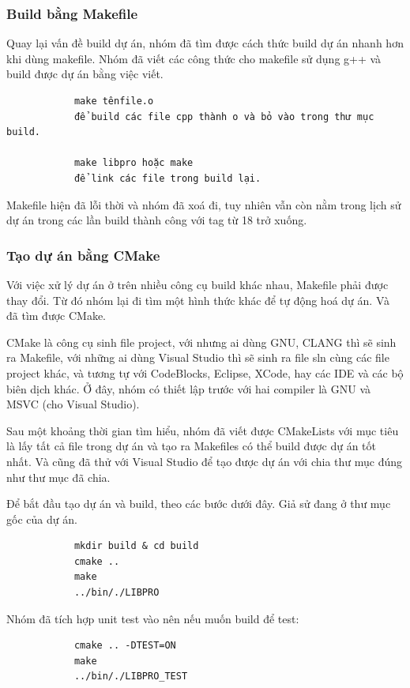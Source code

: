 \documentclass[12pt,a4paper]{report}
\begin{document}
            \subsubsection{Build bằng Makefile}

            Quay lại vấn đề build dự án, nhóm đã tìm được cách thức build dự án nhanh hơn khi dùng makefile. Nhóm đã viết các công thức cho makefile sử dụng g++ và build được dự án bằng việc viết.
            \begin{verbatim}
            make tênfile.o
            để build các file cpp thành o và bỏ vào trong thư mục build.

            make libpro hoặc make
            để link các file trong build lại.
            \end{verbatim}
            Makefile hiện đã lỗi thời và nhóm đã xoá đi, tuy nhiên vẫn còn nằm trong lịch sử dự án trong các lần build thành công với tag từ 18 trở xuống.

            \subsubsection{Tạo dự án bằng CMake}
            Với việc xử lý dự án ở trên nhiều công cụ build khác nhau, Makefile phải được thay đổi. Từ đó nhóm lại đi tìm một hình thức khác để tự động hoá dự án. Và đã tìm được CMake.\par
            CMake là công cụ sinh file project, với nhưng ai dùng GNU, CLANG thì sẽ sinh ra Makefile, với những ai dùng Visual Studio thì sẽ sinh ra file sln cùng các file project khác, và tương tự với CodeBlocks, Eclipse, XCode, hay các IDE và các bộ biên dịch khác. Ở đây, nhóm có thiết lập trước với hai compiler là GNU và MSVC (cho Visual Studio).\par
            Sau một khoảng thời gian tìm hiểu, nhóm đã viết được CMakeLists với mục tiêu là lấy tất cả file trong dự án và tạo ra Makefiles có thể build được dự án tốt nhất. Và cũng đã thử với Visual Studio để tạo được dự án với chia thư mục đúng như thư mục đã chia.\par

            Để bắt đầu tạo dự án và build, theo các bước dưới đây. Giả sử đang ở thư mục gốc của dự án.
            \begin{verbatim}
            mkdir build & cd build
            cmake ..
            make
            ../bin/./LIBPRO
            \end{verbatim}
            Nhóm đã tích hợp unit test vào nên nếu muốn build để test:
            \begin{verbatim}
            cmake .. -DTEST=ON
            make
            ../bin/./LIBPRO_TEST
            \end{verbatim}
\end{document}
